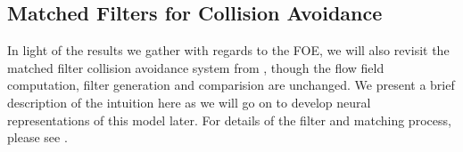 \documentclass[a4paper,11pt,twoside,openright]{article}
\begin{document}








%

\subsection{Matched Filters for Collision Avoidance}\label{sec:offbg}
In light of the results we gather with regards to the FOE, we will
also revisit the matched filter collision avoidance system from
\cite{Mitchell2018}, though the flow field computation, filter
generation and comparision are unchanged. We present a brief
description of the intuition here as we will go on to develop neural
representations of this model later. For details of the filter and
matching process, please see \cite{Mitchell2018}.
\newline\par
\end{document}
